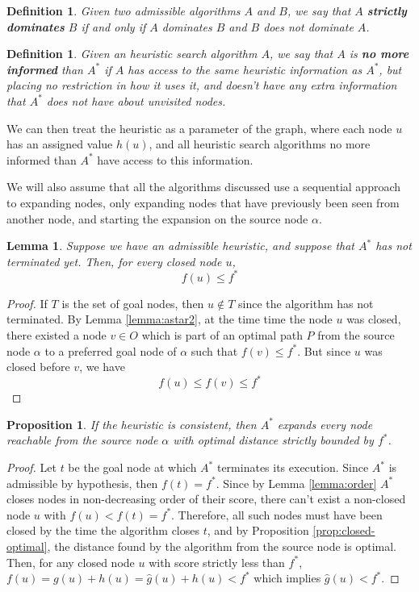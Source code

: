 \documentclass[12pt]{report}
\newtheorem{definition}[theorem]{Definition}
\newtheorem{proposition}[theorem]{Proposition}
\newtheorem{lemma}[theorem]{Lemma}
\begin{document}
\begin{definition}
Given two admissible algorithms $A$ and $B$, we say that $A$ \textbf{strictly dominates} $B$ if and only if $A$ dominates $B$ and $B$ does not dominate $A$.
\end{definition}

\begin{definition}
Given an heuristic search algorithm $A$, we say that $A$ is \textbf{no more informed} than $A^*$ if $A$ has access to the same heuristic information as $A^*$, but placing no restriction in how it uses it, and doesn't have any extra information that $A^*$ does not have about unvisited nodes.
\end{definition}

We can then treat the heuristic as a parameter of the graph, where each node $u$ has an assigned value $h(u)$, and all heuristic search algorithms no more informed than $A^*$ have access to this information.

We will also assume that all the algorithms discussed use a sequential approach to expanding nodes, only expanding nodes that have previously been seen from another node, and starting the expansion on the source node $\alpha$.

\begin{lemma}
\label{lemma:astar-opt}
Suppose we have an admissible heuristic, and suppose that $A^*$ has not terminated yet. Then, for every closed node $u$,
\[ f(u) \leq f^* \]
\end{lemma}
\begin{proof}
If $T$ is the set of goal nodes, then $u \not \in T$ since the algorithm has not terminated. By Lemma \ref{lemma:astar2}, at the time time the node $u$ was closed, there existed a node $v \in O$ which is part of an optimal path $P$ from the source node $\alpha$ to a preferred goal node of $\alpha$ such that $f(v) \leq f^*$.
But since $u$ was closed before $v$, we have
\[ f(u) \leq f(v) \leq f^* \]
\end{proof}

\begin{proposition}
\label{prop:surely}
If the heuristic is consistent, then $A^*$ expands every node reachable from the source node $\alpha$ with optimal distance strictly bounded by $f^*$.
\end{proposition}
\begin{proof}
Let $t$ be the goal node at which $A^*$ terminates its execution. Since $A^*$ is admissible by hypothesis, then $f(t) = f^*$. Since by Lemma \ref{lemma:order} $A^*$ closes nodes in non-decreasing order of their score, there can't exist a non-closed node $u$ with $f(u) < f(t) = f^*$. Therefore, all such nodes must have been closed by the time the algorithm closes $t$, and by Proposition \ref{prop:closed-optimal}, the distance found by the algorithm from the source node is optimal. Then, for any closed node $u$ with score strictly less than $f^*$, $f(u) = g(u) + h(u) = \hat{g}(u) + h(u) < f^*$ which implies $\hat{g}(u) < f^*$.
\end{proof}
\end{document}
